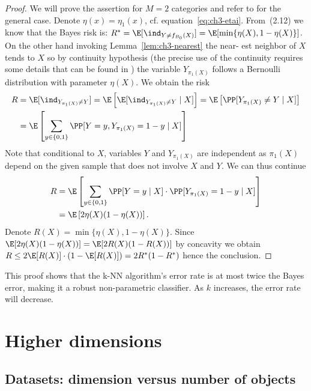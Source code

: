\begin{proof}
We will prove the assertion for $M = 2$ categories and refer to \cite[pages 25-26]{turinici5} for the general case. Denote $\eta(x) = \eta_1(x)$, cf. equation~\eqref{eq:ch3-etai}.
From~(2.12) we know that the Bayes risk is: $R^* = \E[\ind_{Y \neq f_{B_0}(X)}] =
\E[\min\{\eta(X), 1 - \eta(X)\}]$. On the other hand invoking Lemma~\ref{lem:ch3-nearest} the near-
est neighbor of $X$ tends to $X$ so by continuity hypothesis (the precise use
of the continuity requires some details that can be found in \cite[page 24]{turinici5})
the variable $Y_{\pi_1(X)}$ follows a Bernoulli distribution with parameter $\eta(X)$.
We obtain the risk
\begin{align}
R &= \E[\ind_{Y_{\pi_1(X)} \neq Y}] = \E\left[\E[\ind_{Y_{\pi_1(X)} \neq Y} \mid X]\right] = \E\left[\PP[Y_{\pi_1(X)} \neq Y \mid X]\right] \notag \\
  &= \E\left[\sum_{y \in \{0,1\}} \PP[Y = y, Y_{\pi_1(X)} = 1 - y \mid X]\right] \label{eq:ch3-risk-sum}
\end{align}
Note that conditional to $X$, variables $Y$ and $Y_{\pi_1(X)}$ are independent as
$\pi_1(X)$ depend on the given sample that does not involve $X$ and $Y$. We can
thus continue
\begin{align}
R &= \E\left[\sum_{y \in \{0,1\}} \PP[Y = y \mid X] \cdot \PP[Y_{\pi_1(X)} = 1 - y \mid X]\right] \notag \\
  &= \E\left[2 \eta(X)(1 - \eta(X))\right]. \label{eq:ch3-risk-final}
\end{align}
Denote $R(X) = \min\{\eta(X), 1 - \eta(X)\}$. Since $\E[2\eta(X)(1 - \eta(X))] =
\E[2R(X)(1 - R(X))]$ by concavity we obtain $R \leq 2\E[R(X)] \cdot (1 -
\E[R(X)]) = 2R^*(1 - R^*)$ hence the conclusion.
\end{proof}

\begin{remark}\label{rem:ch3-error-rate}
This proof shows that the k-NN algorithm's error rate is at
most twice the Bayes error, making it a robust non-parametric classifier.
As $k$ increases, the error rate will decrease.
\end{remark}

\section{Higher dimensions}
\label{sec:ch3-higher-dim}

\subsection{Datasets: dimension versus number of objects}
\label{sec:ch3-datasets}

